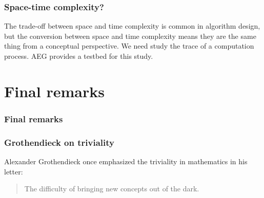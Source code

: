 \documentclass[aspectratio=169]{beamer}
\begin{document}
\begin{frame}
    \frametitle{Space-time complexity?}
    The trade-off between space and time complexity is common in algorithm design,
    but the conversion between space and time complexity means they are the same thing from a conceptual perspective.
    We need study the trace of a computation process.
    AEG provides a testbed for this study.
\end{frame}

\section{Final remarks}

\begin{frame}
    \frametitle{Final remarks}
    \begin{figure}[ht]\centering
    \end{figure}
\end{frame}

\begin{frame}
    \frametitle{Grothendieck on triviality}
    Alexander Grothendieck once emphasized the triviality in mathematics in his letter:
    \newline
    \begin{quote}
       The difficulty of bringing new concepts out of the dark.
    \end{quote}
\end{frame}
\end{document}
